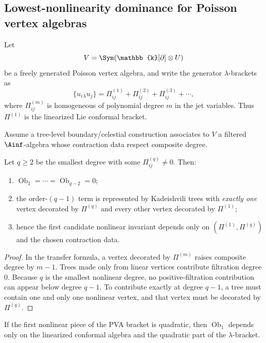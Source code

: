 \subsection{Lowest-nonlinearity dominance for Poisson vertex algebras}
\label{sec:cbt-lowest-nonlinearity}

Let
\[
V=\Sym(\mathbb{k}[\partial]\otimes U)
\]
be a freely generated Poisson vertex algebra, and write the generator $\lambda$-brackets as
\[
\{u_i{}_\lambda u_j\}
=
\Pi^{(1)}_{ij}
+\Pi^{(2)}_{ij}
+\Pi^{(3)}_{ij}
+\cdots,
\]
where $\Pi^{(m)}_{ij}$ is homogeneous of polynomial degree $m$ in the jet variables. Thus $\Pi^{(1)}$ is the linearized Lie conformal bracket.

Assume a tree-level boundary/celestial construction associates to $V$ a filtered $\Ainf$-algebra whose contraction data respect composite degree.

\begin{theorem}
\label{thm:cbt-lowest-nonlinearity}
\ClaimStatusProvedHere
Let $q\ge2$ be the smallest degree with some $\Pi^{(q)}_{ij}\neq0$. Then:
\begin{enumerate}[label=\textup{(\roman*)},leftmargin=2em]
\item $\operatorname{Ob}_1=\cdots=\operatorname{Ob}_{q-2}=0$;
\item the order-$(q-1)$ term is represented by Kadeishvili trees with \emph{exactly one} vertex decorated by $\Pi^{(q)}$ and every other vertex decorated by $\Pi^{(1)}$;
\item hence the first candidate nonlinear invariant depends only on $(\Pi^{(1)},\Pi^{(q)})$ and the chosen contraction data.
\end{enumerate}
\end{theorem}

\begin{proof}
In the transfer formula, a vertex decorated by $\Pi^{(m)}$ raises composite degree by $m-1$. Trees made only from linear vertices contribute filtration degree $0$. Because $q$ is the smallest nonlinear degree, no positive-filtration contribution can appear below degree $q-1$. To contribute exactly at degree $q-1$, a tree must contain one and only one nonlinear vertex, and that vertex must be decorated by $\Pi^{(q)}$.
\end{proof}

\begin{corollary}
\label{cor:cbt-quadratic-control}
\ClaimStatusProvedHere
If the first nonlinear piece of the PVA bracket is quadratic, then $\operatorname{Ob}_1$ depends only on the linearized conformal algebra and the quadratic part of the $\lambda$-bracket.
\end{corollary}

